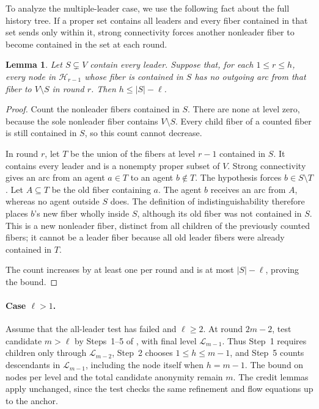 \documentclass[11pt]{article}
\newtheorem{lemma}{Lemma}
\begin{document}
To analyze the multiple-leader case, we use the following fact about
the full history tree. If a proper set contains all leaders and
every fiber contained in that set sends only within it, strong
connectivity forces another nonleader fiber to become contained
in the set at each round.

\begin{lemma}
\label{lem:forward-fibers}
Let \(S\subsetneq V\) contain every leader. Suppose that, for each
\(1\leq r\leq h\), every node in \(\mathcal H_{r-1}\) whose fiber
is contained in \(S\) has no outgoing arc from that fiber to
\(V\setminus S\) in round \(r\). Then \(h\leq |S|-\ell\).
\end{lemma}

\begin{proof}
Count the nonleader fibers contained in \(S\). There are none at
level zero, because the sole nonleader fiber contains \(V\setminus S\).
Every child fiber of a counted fiber is still contained in \(S\),
so this count cannot decrease.

In round \(r\), let \(T\) be the union of the fibers at level
\(r-1\) contained in \(S\). It contains every leader and is a
nonempty proper subset of \(V\). Strong connectivity gives an
arc from an agent \(a\in T\) to an agent \(b\notin T\).
The hypothesis forces \(b\in S\setminus T\).
Let \(A\subseteq T\) be the old fiber containing \(a\).
The agent \(b\) receives an arc from \(A\), whereas no agent
outside \(S\) does. The definition of indistinguishability therefore
places \(b\)'s new fiber wholly inside \(S\), although its old
fiber was not contained in \(S\).
This is a new nonleader fiber, distinct from all children of the
previously counted fibers; it cannot be a leader fiber because all
old leader fibers were already contained in \(T\).

The count increases by at least one per round and is at most
\(|S|-\ell\), proving the bound.
\end{proof}

\paragraph{Case \(\ell>1\).}
Assume that the all-leader test has failed and \(\ell\geq2\).
At round \(2m-2\), test candidate \(m>\ell\) by Steps~1--5 of
, with final level \(\mathcal L_{m-1}\).
Thus Step~1 requires children only through \(\mathcal L_{m-2}\),
Step~2 chooses \(1\leq h\leq m-1\), and Step~5 counts descendants
in \(\mathcal L_{m-1}\), including the node itself when \(h=m-1\).
The bound on nodes per level and the total candidate anonymity
remain \(m\). The credit lemmas apply unchanged, since the test
checks the same refinement and flow equations up to the anchor.
\end{document}
